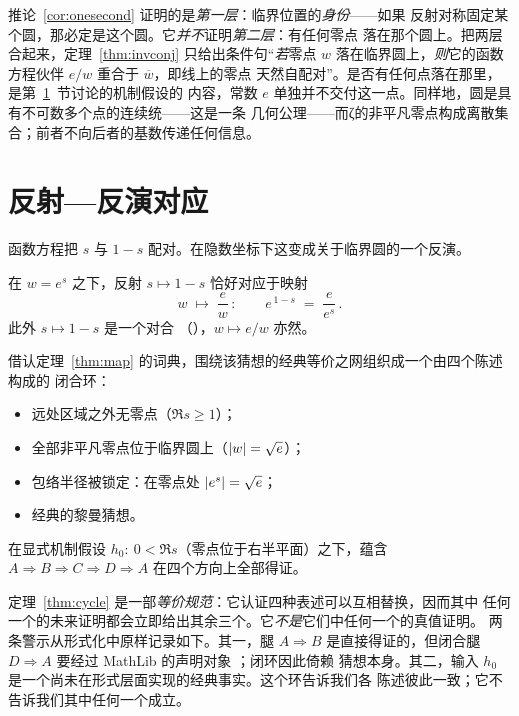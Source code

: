 \begin{remark}[“位置”的两个层次]\label{rem:twolayers}
推论~\ref{cor:onesecond} 证明的是\emph{第一层}：临界位置的\emph{身份}——如果
反射对称固定某个圆，那必定是这个圆。它\emph{并不}证明\emph{第二层}：有任何零点
落在那个圆上。把两层合起来，定理~\ref{thm:invconj} 只给出条件句“\emph{若}零点 $w$
落在临界圆上，\emph{则}它的函数方程伙伴 $e/w$ 重合于 $\overline{w}$，即线上的零点
天然自配对”。是否有任何点落在那里，是第~\ref{sec:reflection}~节讨论的机制假设的
内容，常数 $e$ 单独并不交付这一点。同样地，圆是具有不可数多个点的连续统——这是一条
几何公理——而ζ的非平凡零点构成离散集合；前者不向后者的基数传递任何信息。
\end{remark}

\section{反射—反演对应}\label{sec:reflection}

函数方程把 $s$ 与 $1-s$ 配对。在隐数坐标下这变成关于临界圆的一个反演。

\begin{theorem}
\label{thm:map}
在 $w=e^{s}$ 之下，反射 $s\mapsto 1-s$ 恰好对应于映射
\[
  w \;\longmapsto\; \frac{e}{w}\, :
  \qquad e^{\,1-s} \;=\; \frac{e}{e^{s}}\, .
\]
此外 $s\mapsto 1-s$ 是一个对合
（），$w\mapsto e/w$ 亦然。
\end{theorem}

借认定理~\ref{thm:map} 的词典，围绕该猜想的经典等价之网组织成一个由四个陈述构成的
闭合环：
\begin{itemize}
\item[\textup{(A)}] 远处区域之外无零点（$\Re s\geq 1$）；
\item[\textup{(B)}] 全部非平凡零点位于临界圆上（$\lvert w\rvert=\sqrt{e}$）；
\item[\textup{(C)}] 包络半径被锁定：在零点处 $\lvert e^{s}\rvert=\sqrt{e}$；
\item[\textup{(D)}] 经典的黎曼猜想。
\end{itemize}

\begin{theorem}
\label{thm:cycle}
在显式机制假设 $h_0:\ 0<\Re s$（零点位于右半平面）之下，蕴含
$A\Rightarrow B\Rightarrow C\Rightarrow D\Rightarrow A$
在四个方向上全部得证。
\end{theorem}

\begin{remark}\label{rem:cycle}
定理~\ref{thm:cycle} 是一部\emph{等价规范}：它认证四种表述可以互相替换，因而其中
任何一个的未来证明都会立即给出其余三个。它\emph{不是}它们中任何一个的真值证明。
两条警示从形式化中原样记录如下。其一，腿 $A\Rightarrow B$ 是直接得证的，但闭合腿
$D\Rightarrow A$ 要经过 MathLib 的声明对象 ；闭环因此倚赖
猜想本身。其二，输入 $h_0$ 是一个尚未在形式层面实现的经典事实。这个环告诉我们各
陈述彼此一致；它不告诉我们其中任何一个成立。
\end{remark}

